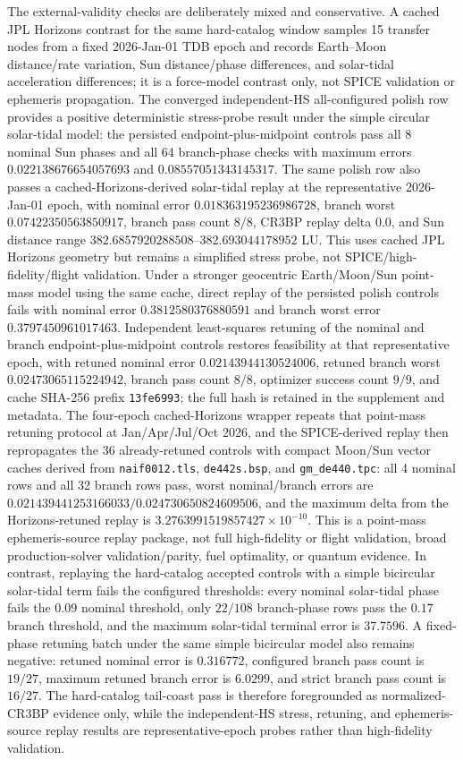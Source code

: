 \documentclass[preprint,12pt]{elsarticle}
\begin{document}
The external-validity checks are deliberately mixed and conservative. A cached JPL Horizons contrast for the same hard-catalog window samples 15 transfer nodes from a fixed 2026-Jan-01 TDB epoch and records Earth--Moon distance/rate variation, Sun distance/phase differences, and solar-tidal acceleration differences; it is a force-model contrast only, not SPICE validation or ephemeris propagation. The converged independent-HS all-configured polish row provides a positive deterministic stress-probe result under the simple circular solar-tidal model: the persisted endpoint-plus-midpoint controls pass all 8 nominal Sun phases and all 64 branch-phase checks with maximum errors $0.022138676654057693$ and $0.08557051343145317$. The same polish row also passes a cached-Horizons-derived solar-tidal replay at the representative 2026-Jan-01 epoch, with nominal error $0.018363195236986728$, branch worst $0.07422350563850917$, branch pass count $8/8$, CR3BP replay delta $0.0$, and Sun distance range $382.6857920288508$--$382.693044178952$ LU. This uses cached JPL Horizons geometry but remains a simplified stress probe, not SPICE/high-fidelity/flight validation. Under a stronger geocentric Earth/Moon/Sun point-mass model using the same cache, direct replay of the persisted polish controls fails with nominal error $0.3812580376880591$ and branch worst error $0.3797450961017463$. Independent least-squares retuning of the nominal and branch endpoint-plus-midpoint controls restores feasibility at that representative epoch, with retuned nominal error $0.02143944130524006$, retuned branch worst $0.02473065115224942$, branch pass count $8/8$, optimizer success count $9/9$, and cache SHA-256 prefix \texttt{13fe6993}; the full hash is retained in the supplement and metadata. The four-epoch cached-Horizons wrapper repeats that point-mass retuning protocol at Jan/Apr/Jul/Oct 2026, and the SPICE-derived replay then repropagates the 36 already-retuned controls with compact Moon/Sun vector caches derived from \texttt{naif0012.tls}, \texttt{de442s.bsp}, and \texttt{gm\_de440.tpc}: all 4 nominal rows and all 32 branch rows pass, worst nominal/branch errors are $0.021439441253166033/0.024730650824609506$, and the maximum delta from the Horizons-retuned replay is $3.2763991519857427\times10^{-10}$. This is a point-mass ephemeris-source replay package, not full high-fidelity or flight validation, broad production-solver validation/parity, fuel optimality, or quantum evidence. In contrast, replaying the hard-catalog accepted controls with a simple bicircular solar-tidal term fails the configured thresholds: every nominal solar-tidal phase fails the $0.09$ nominal threshold, only $22/108$ branch-phase rows pass the $0.17$ branch threshold, and the maximum solar-tidal terminal error is $37.7596$. A fixed-phase retuning batch under the same simple bicircular model also remains negative: retuned nominal error is $0.316772$, configured branch pass count is $19/27$, maximum retuned branch error is $6.0299$, and strict branch pass count is $16/27$. The hard-catalog tail-coast pass is therefore foregrounded as normalized-CR3BP evidence only, while the independent-HS stress, retuning, and ephemeris-source replay results are representative-epoch probes rather than high-fidelity validation.
\end{document}
